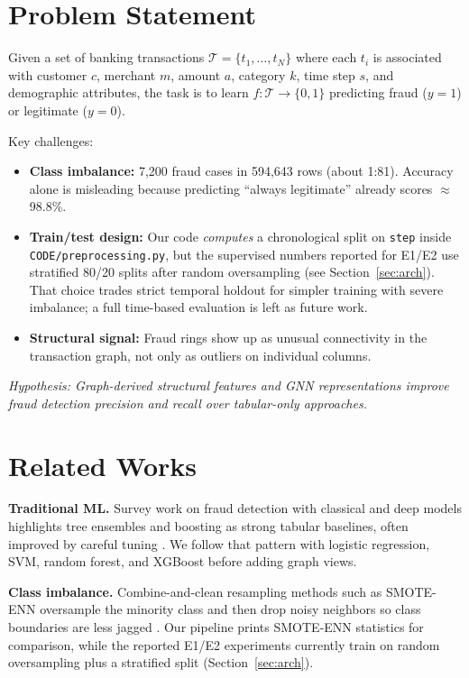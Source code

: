 \documentclass[conference]{IEEEtran}
\begin{document}
\section{Problem Statement}

Given a set of banking transactions $\mathcal{T} = \{t_1, \ldots, t_N\}$ where each $t_i$ is associated with customer $c$, merchant $m$, amount $a$, category $k$, time step $s$, and demographic attributes, the task is to learn $f: \mathcal{T} \rightarrow \{0,1\}$ predicting fraud ($y=1$) or legitimate ($y=0$).

Key challenges:
\begin{itemize}
    \item \textbf{Class imbalance:} 7,200 fraud cases in 594,643 rows (about 1:81). Accuracy alone is misleading because predicting ``always legitimate'' already scores $\approx$98.8\%.
    \item \textbf{Train/test design:} Our code \textit{computes} a chronological split on \texttt{step} inside \texttt{CODE/preprocessing.py}, but the supervised numbers reported for E1/E2 use stratified 80/20 splits after random oversampling (see Section~\ref{sec:arch}). That choice trades strict temporal holdout for simpler training with severe imbalance; a full time-based evaluation is left as future work.
    \item \textbf{Structural signal:} Fraud rings show up as unusual connectivity in the transaction graph, not only as outliers on individual columns.
\end{itemize}

\textit{Hypothesis: Graph-derived structural features and GNN representations improve fraud detection precision and recall over tabular-only approaches.}

\section{Related Works}

\textbf{Traditional ML.}
Survey work on fraud detection with classical and deep models highlights tree ensembles and boosting as strong tabular baselines, often improved by careful tuning \cite{b7}. We follow that pattern with logistic regression, SVM, random forest, and XGBoost before adding graph views.

\textbf{Class imbalance.}
Combine-and-clean resampling methods such as SMOTE-ENN oversample the minority class and then drop noisy neighbors so class boundaries are less jagged \cite{b7}. Our pipeline prints SMOTE-ENN statistics for comparison, while the reported E1/E2 experiments currently train on random oversampling plus a stratified split (Section~\ref{sec:arch}).
\end{document}
